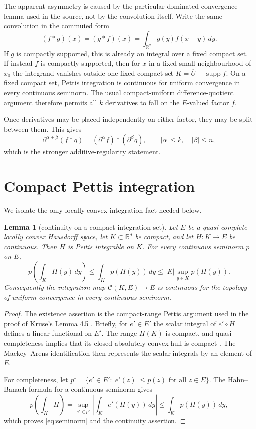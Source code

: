 \documentclass[11pt]{article}
\newtheorem{lemma}{Lemma}
\newcommand{\R}{\mathbb{R}}
\newcommand{\supp}{\operatorname{supp}}
\newcommand{\C}{\mathcal{C}}
\begin{document}
The apparent asymmetry is caused by the particular dominated-convergence
lemma used in the source, not by the convolution itself. Write the same
convolution in the commuted form
\[
 (f*g)(x)=(g*f)(x)=\int_{\R^d}g(y)f(x-y)\,dy.
\]
If $g$ is compactly supported, this is already an integral over a fixed
compact set. If instead $f$ is compactly supported, then for $x$ in a fixed
small neighbourhood of $x_0$ the integrand vanishes outside one fixed compact
set $K=\overline U-\supp f$. On a fixed compact set, Pettis integration is
continuous for uniform convergence in every continuous seminorm. The usual
compact-uniform difference-quotient argument therefore permits all $k$
derivatives to fall on the $E$-valued factor $f$.

Once derivatives may be placed independently on either factor, they may be
split between them. This gives
\[
 \partial^{\alpha+\beta}(f*g)
   = (\partial^\alpha f)*(\partial^\beta g),
 \qquad |\alpha|\le k,\quad |\beta|\le n,
\]
which is the stronger additive-regularity statement.

\section{Compact Pettis integration}

We isolate the only locally convex integration fact needed below.

\begin{lemma}[continuity on a compact integration set]\label{lem:compact}
Let $E$ be a quasi-complete locally convex Hausdorff space, let
$K\subset\R^d$ be compact, and let $H:K\to E$ be continuous. Then $H$ is
Pettis integrable on $K$. For every continuous seminorm $p$ on $E$,
\begin{equation}\label{eq:seminorm}
 p\!\left(\int_K H(y)\,dy\right)
 \le \int_K p(H(y))\,dy
 \le |K|\sup_{y\in K}p(H(y)).
\end{equation}
Consequently the integration map $\C(K,E)\to E$ is continuous for the
topology of uniform convergence in every continuous seminorm.
\end{lemma}

\begin{proof}
The existence assertion is the compact-range Pettis argument used in the
proof of Kruse's Lemma 4.5 \cite[pp.~15--16]{Kruse2019}. Briefly, for
$e'\in E'$ the scalar integral of $e'\circ H$ defines a linear functional on
$E'$. The range $H(K)$ is compact, and quasi-completeness implies that its
closed absolutely convex hull is compact
\cite[9-2-10 Example, p.~134]{Wilansky1978}. The Mackey--Arens identification
then represents the scalar integrals by an element of $E$.

For completeness, let $p^\circ=\{e'\in E':|e'(z)|\le p(z)\text{ for all }
z\in E\}$. The Hahn--Banach formula for a continuous seminorm gives
\[
 p\!\left(\int_KH\right)
 =\sup_{e'\in p^\circ}\left|\int_K e'(H(y))\,dy\right|
 \le\int_Kp(H(y))\,dy,
\]
which proves \eqref{eq:seminorm} and the continuity assertion.
\end{proof}
\end{document}
